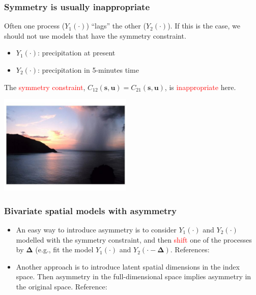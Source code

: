 \documentclass{beamer}
\newcommand{\Deltab} {\boldsymbol{\Delta}}
\newcommand{\s}{\mathbf{s}}
\renewcommand{\u}{\mathbf{u}}
\begin{document}

\begin{frame}
\frametitle{Symmetry is usually inappropriate}
Often one process ($Y_{1}(\cdot)$) ``lags'' the other ($Y_2(\cdot)$). If this is the case, we should not use models that have the symmetry constraint.
\begin{itemize}
\item $Y_1(\cdot)$: precipitation at present
\item $Y_2(\cdot)$: precipitation in 5-minutes time
\end{itemize}
The \textcolor{red}{symmetry constraint}, $C_{12}(\s,\u)=C_{21}(\s,\u)$, is \textcolor{red}{inappropriate} here.
\vspace{-0.5cm}

\begin{center}
\includegraphics[width=2.5in]{rain.png}
\end{center}
\end{frame}


\begin{frame}
\frametitle{Bivariate spatial models with asymmetry}

\begin{itemize}
\item An easy way to introduce asymmetry is to consider $Y_1(\cdot)$ and $Y_2(\cdot)$ modelled with the symmetry constraint, and then \textcolor{red}{shift} one of the processes by $\Deltab$ (e.g., fit the model $Y_1(\cdot)$ and $Y_2(\cdot-\Deltab)$. 
\newline References: \cite{VerHoefCressie1993,ChristensenAmemiya2001,ChristensenAmemiya2002,Li_2011}
\vfill
\item Another approach is to introduce latent spatial dimensions in the index space. Then asymmetry in the full-dimensional space implies asymmetry in the original space. Reference:~\cite{Apanasovich_2010}
\end{itemize}
\vfill
\end{frame}
\end{document}
